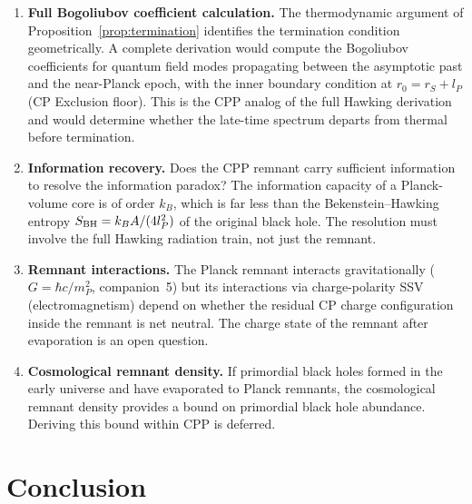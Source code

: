 \documentclass[12pt]{article}
\newcommand{\lP}{l_P}
\newcommand{\mP}{m_P}
\newcommand{\rS}{r_S}
\begin{document}
\begin{enumerate}
  \item \label{op:bogoliubov}
    \textbf{Full Bogoliubov coefficient calculation.}
    The thermodynamic argument of Proposition~\ref{prop:termination}
    identifies the termination condition geometrically.  A complete
    derivation would compute the Bogoliubov coefficients for quantum
    field modes propagating between the asymptotic past and the
    near-Planck epoch, with the inner boundary condition at
    $r_0 = \rS + \lP$ (CP Exclusion floor).  This is the CPP analog
    of the full Hawking derivation and would determine whether the
    late-time spectrum departs from thermal before termination.

  \item \textbf{Information recovery.}
    Does the CPP remnant carry sufficient information to resolve the
    information paradox?  The information capacity of a Planck-volume
    core is of order $k_B$, which is far less than the
    Bekenstein--Hawking entropy $S_{\rm BH} = k_B A/(4\lP^2)$ of
    the original black hole.  The resolution must involve the full
    Hawking radiation train, not just the remnant.

  \item \textbf{Remnant interactions.}
    The Planck remnant interacts gravitationally ($G = \hbar c/\mP^2$,
    companion~5) but its interactions via charge-polarity SSV
    (electromagnetism) depend on whether the residual CP charge
    configuration inside the remnant is net neutral.  The charge
    state of the remnant after evaporation is an open question.

  \item \textbf{Cosmological remnant density.}
    If primordial black holes formed in the early universe and have
    evaporated to Planck remnants, the cosmological remnant density
    provides a bound on primordial black hole abundance.  Deriving
    this bound within CPP is deferred.
\end{enumerate}

\section{Conclusion}
\label{sec:conclusion}
\end{document}
